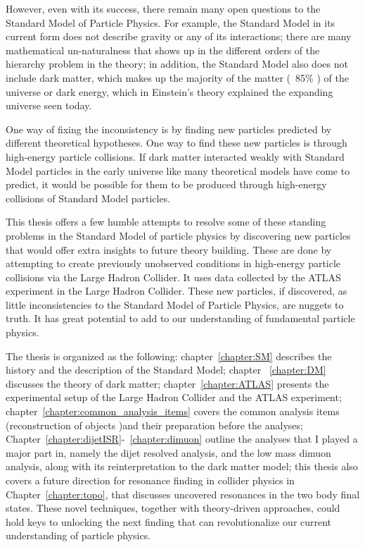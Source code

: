 However, even with its success, there remain many open questions to the Standard Model of Particle Physics. %
For example, the Standard Model in its current form does not describe gravity or any of its interactions; there are many mathematical un-naturalness that shows up in the different orders of the hierarchy problem in the theory; in addition, the
Standard Model also does not include dark matter, which makes up the majority of the matter (~85\% ) of the universe or dark energy, which in 
Einstein's theory explained the expanding universe seen today.  

One way of fixing the inconsistency is by finding new particles predicted by different theoretical hypotheses. One way to find these new particles  is through high-energy particle collisions. If dark matter interacted weakly with Standard Model particles in the early universe like many theoretical models have come to predict, it would be possible for them to be produced through high-energy collisions of Standard Model particles.

This thesis offers a few humble attempts to resolve some of these standing problems in the Standard Model of particle physics by discovering new particles that would offer extra insights to future theory building. These are done by attempting to create previously unobserved conditions in high-energy particle collisions via the Large Hadron Collider. It uses data collected by the ATLAS experiment in the Large Hadron Collider. These new particles, if discovered, as little inconsistencies to the Standard Model of Particle
Physics, are nuggets to truth. It has great potential to add to our understanding of fundamental particle physics.

The thesis is organized as the following: chapter~\ref{chapter:SM} describes the history and the description of the Standard Model; chapter ~\ref{chapter:DM} discusses the theory of dark matter; chapter~\ref{chapter:ATLAS} presents the experimental setup of the Large Hadron Collider and the ATLAS experiment;
chapter~\ref{chapter:common_analysis_items} covers the common analysis items (reconstruction
of objects )and their preparation before the analyses; Chapter~\ref{chapter:dijetISR}-~\ref{chapter:dimuon} outline the analyses that I played a major part in, namely the dijet resolved analysis, and the low mass dimuon analysis, along with its reinterpretation to the dark matter model; this thesis also covers a future direction for resonance finding in collider physics in Chapter~\ref{chapter:topo}, that discusses uncovered resonances in the two body final states. 
These novel techniques, together with theory-driven approaches, could hold keys to unlocking the next finding that can revolutionalize our current understanding of particle physics. 

